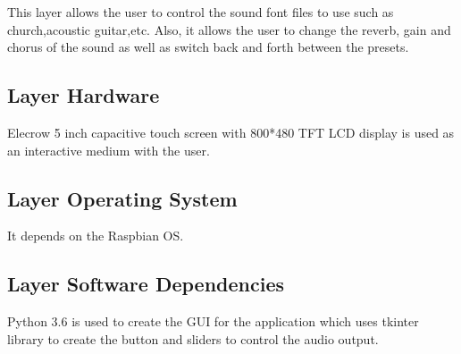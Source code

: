 This layer allows the user to control the sound font files to use such as church,acoustic guitar,etc. Also, it allows the user to change the reverb, gain and chorus of the sound as well as switch back and forth between the presets.

\subsection{Layer Hardware}
Elecrow 5 inch capacitive touch screen with 800*480 TFT LCD display is used as an interactive medium with the user.

\subsection{Layer Operating System}
It depends on the Raspbian OS.

\subsection{Layer Software Dependencies}
Python 3.6 is used to create the GUI for the application which uses tkinter library to create the button and sliders to control the audio output.  



